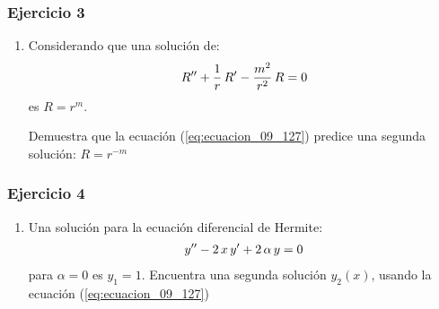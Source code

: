 \documentclass[12pt]{beamer}
\begin{document}
\begin{frame}
\frametitle{Ejercicio 3}
\begin{enumerate}
\conti
\item Considerando que una solución de:
\begin{align*}
{R}^{\prime \prime} + \dfrac{1}{r} \, {R}^{\prime} - \dfrac{m^{2}}{r^{2}} \, R = 0
\end{align*}
es $R = r^{m}$.

Demuestra que la ecuación (\ref{eq:ecuacion_09_127}) predice una segunda solución: $R = r^{-m}$
\seti
\end{enumerate}
\end{frame}
\begin{frame}
\frametitle{Ejercicio 4}
\begin{enumerate}
\conti
\item Una solución para la ecuación diferencial de Hermite:
\begin{align*}
{y}^{\prime \prime} - 2 \, x \, {y}^{\prime} + 2 \, \alpha \, y = 0
\end{align*}
para $\alpha = 0$ es $y_{1} = 1$. Encuentra una segunda solución $y_{2}(x)$, usando la ecuación (\ref{eq:ecuacion_09_127})
\end{enumerate}
\end{frame}
\end{document}
